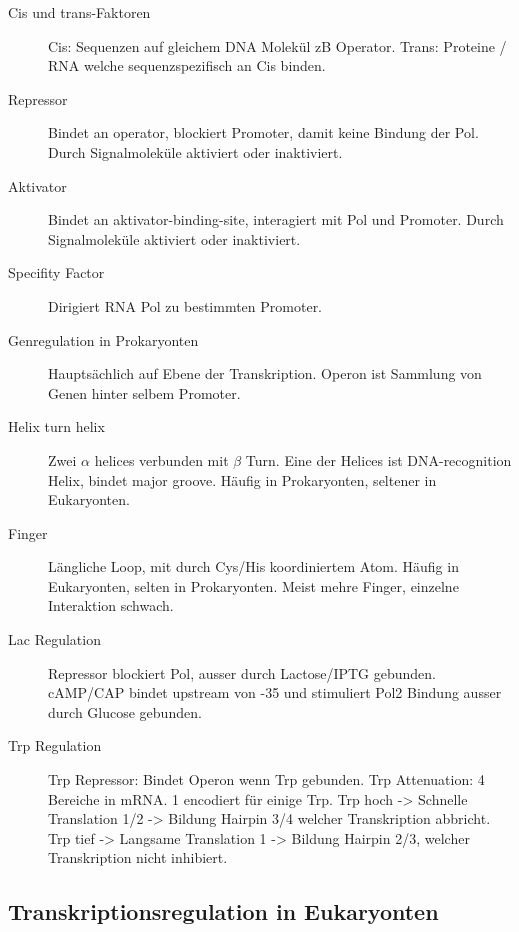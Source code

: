 \documentclass[a4paper,twocolumn,usegeometry,english,fontsize=5,DIV=28]{scrartcl}
\begin{document}
\begin{description}
	\item[Cis und trans-Faktoren] Cis: Sequenzen auf gleichem DNA Molekül
		zB Operator. Trans: Proteine / RNA welche sequenzspezifisch an
		Cis binden.
	\item[Repressor] Bindet an operator, blockiert Promoter, damit keine
		Bindung der Pol. Durch Signalmoleküle aktiviert oder
		inaktiviert.
	\item[Aktivator] Bindet an aktivator-binding-site, interagiert mit Pol
		und Promoter.  Durch Signalmoleküle aktiviert oder inaktiviert.
	\item[Specifity Factor] Dirigiert RNA Pol zu bestimmten Promoter.
	\item[Genregulation in Prokaryonten] Hauptsächlich auf Ebene der
		Transkription. Operon ist Sammlung von Genen hinter selbem
		Promoter.
	\item[Helix turn helix] Zwei $\alpha$ helices verbunden mit $\beta$
		Turn. Eine der Helices ist DNA-recognition Helix, bindet major
		groove. Häufig in Prokaryonten, seltener in Eukaryonten.
	\item[ Finger] Längliche Loop, mit durch Cys/His koordiniertem
		 Atom. Häufig in Eukaryonten, selten in Prokaryonten.
		Meist mehre Finger, einzelne Interaktion schwach.
	\item[Lac Regulation] Repressor blockiert Pol, ausser durch
		Lactose/IPTG gebunden. cAMP/CAP bindet upstream von -35 und
		stimuliert Pol2 Bindung ausser durch Glucose gebunden.
	\item[Trp Regulation] Trp Repressor: Bindet Operon wenn Trp gebunden.
		Trp Attenuation: 4 Bereiche in mRNA. 1 encodiert für einige
		Trp. Trp hoch -> Schnelle Translation 1/2 -> Bildung Hairpin
		3/4 welcher Transkription abbricht. Trp tief -> Langsame
		Translation 1 -> Bildung Hairpin 2/3, welcher Transkription
		nicht inhibiert.
\end{description}

\subsection{Transkriptionsregulation in Eukaryonten}
\end{document}

